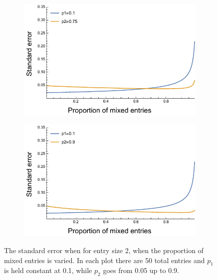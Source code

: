 \documentclass[aoas]{imsart}
\begin{document}
\begin{figure}[h]
\begin{subfigure}[b]{0.49\textwidth}
\end{subfigure}
\hfill
\begin{subfigure}[b]{0.49\textwidth}
\includegraphics[width=\textwidth]{../asymptotic_approximation/SE_twotype_p1_01_p2_075.pdf}
\end{subfigure}
\begin{subfigure}[b]{0.49\textwidth}
\includegraphics[width=\textwidth]{../asymptotic_approximation/SE_twotype_p1_01_p2_09.pdf}
\end{subfigure}

\caption{The standard error when for entry size 2, when the proportion of mixed entries is varied. In each plot there are 50 total entries and \(p_1\) is held constant at 0.1, while \(p_2\) goes from 0.05 up to 0.9.}
\label{fig:two_type_se_fourplot}
\end{figure}
\end{document}
